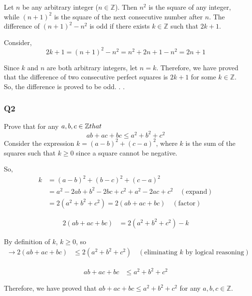 \documentclass{article}
\begin{document}
 Let $n$ be any arbitrary integer ($n \in \mathbb{Z}$). Then $n^2$ is the square of any integer, while $(n+1)^2$ is the square of the next consecutive number after $n$. The difference of $(n+1)^2 - n^2$ is odd if there exists $k \in \mathbb{Z}$ such that $2k+1$.

Consider,
\[
2k+1 = (n+1)^2 - n^2
        = n^2 + 2n + 1 - n^2
        = 2n + 1
\]

Since $k$ and $n$ are both arbitrary integers, let $n = k$. Therefore, we have proved that the difference of two consecutive perfect squares is $2k+1$ for some $k \in \mathbb{Z}$. So, the difference is proved to be odd.
.
.
   
    
\subsubsection{Q2}
Prove that for any $a,b,c \in \mathbb{Z} that \\$
$$ab+ac+bc \le a^{2} + b^{2}+c^{2}$$
Consider the expression \(k = (a-b)^2 + (c-a)^2\), where \(k\) is the sum of the squares such that \(k \geq 0\) since a square cannot be negative.

So,
\[
\begin{aligned}
    k & = (a-b)^2 + (b-c)^2 + (c-a)^2 \\
    & = a^2 - 2ab + b^2 - 2bc + c^2 + a^2 - 2ac + c^2 \quad (\text{expand}) \\
    & = 2(a^2 + b^2 + c^2) = 2(ab + ac + bc) \quad (\text{factor})
\end{aligned}
\]

\[
\begin{aligned}
    2(ab + ac + bc) & = 2(a^2 + b^2 + c^2) - k
\end{aligned}
\]

By definition of \(k\), \(k \geq 0\), so
\[
\begin{aligned}
    \rightarrow 2(ab + ac + bc) & \leq 2(a^2 + b^2 + c^2) \quad (\text{eliminating } k \text{ by logical reasoning})
\end{aligned}
\]

\[
\begin{aligned}
    ab + ac + bc & \leq a^2 + b^2 + c^2
\end{aligned}
\]

Therefore, we have proved that \(ab + ac + bc \leq a^2 + b^2 + c^2\) for any \(a, b, c \in \mathbb{Z}\).
\end{document}
